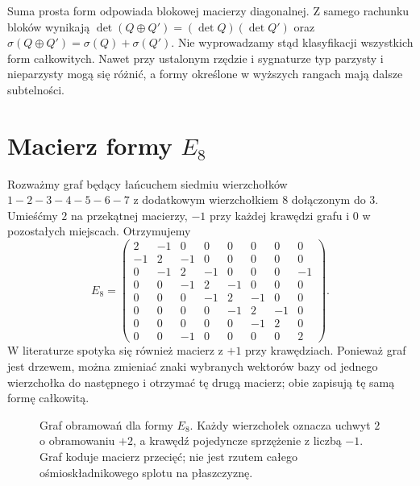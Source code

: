 Suma prosta form odpowiada blokowej macierzy diagonalnej.
Z samego rachunku bloków wynikają
$\det(Q\oplus Q')=(\det Q)(\det Q')$ oraz
$\sigma(Q\oplus Q')=\sigma(Q)+\sigma(Q')$.
Nie wyprowadzamy stąd klasyfikacji wszystkich form
całkowitych. Nawet przy ustalonym rzędzie i sygnaturze
typ parzysty i nieparzysty mogą się różnić, a formy
określone w wyższych rangach mają dalsze subtelności.

\section{Macierz formy \texorpdfstring{$E_8$}{E8}}
\label{sec:freedman-E8}

Rozważmy graf będący łańcuchem siedmiu wierzchołków
$1-2-3-4-5-6-7$ z dodatkowym wierzchołkiem $8$
dołączonym do $3$. Umieśćmy $2$ na przekątnej
macierzy, $-1$ przy każdej krawędzi grafu i $0$
w pozostałych miejscach. Otrzymujemy
\begin{equation}\label{eq:freedman-E8}
 E_8=\begin{pmatrix}
 2&-1& 0& 0& 0& 0& 0& 0\\
 -1& 2&-1& 0& 0& 0& 0& 0\\
 0&-1& 2&-1& 0& 0& 0&-1\\
 0& 0&-1& 2&-1& 0& 0& 0\\
 0& 0& 0&-1& 2&-1& 0& 0\\
 0& 0& 0& 0&-1& 2&-1& 0\\
 0& 0& 0& 0& 0&-1& 2& 0\\
 0& 0&-1& 0& 0& 0& 0& 2
 \end{pmatrix}.
\end{equation}
W literaturze spotyka się również macierz z $+1$
przy krawędziach. Ponieważ graf jest drzewem, można
zmieniać znaki wybranych wektorów bazy od jednego
wierzchołka do następnego i otrzymać tę drugą macierz;
obie zapisują tę samą formę całkowitą.

\begin{figure}[htbp]
\centering
{}
\caption{Graf obramowań dla formy $E_8$.
Każdy wierzchołek oznacza uchwyt $2$ o obramowaniu $+2$,
a krawędź pojedyncze sprzężenie z liczbą $-1$.
Graf koduje macierz przecięć; nie jest rzutem całego
ośmioskładnikowego splotu na płaszczyznę.}
\label{fig:freedman-E8-graph}
\end{figure}

